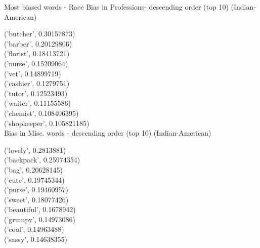 \documentclass{beamer}
\begin{document}
		\begin{frame}[allowframebreaks]{Most biased words - Race}
		Bias in Professions- descending order (top 10) (Indian-American)
		
		('butcher', 0.30157873)
\\
		('barber', 0.20129806)
\\
		('florist', 0.18413721)
\\
		('nurse', 0.15209064)
\\
		('vet', 0.14899719)
\\
		('cashier', 0.1279751) \\
		('tutor', 0.12523493)
\\
		('waiter', 0.11155586)
\\ 
		('chemist', 0.108406395)
\\
		('shopkeeper', 0.105821185) \\
		
		\vspace{5mm}
		Bias in Misc. words - descending order (top 10) (Indian-American)
		
		('lovely', 0.2813881)
\\
		('backpack', 0.25974354) \\
		('bag', 0.20628145)
\\
		('cute', 0.19745344)
\\
		('purse', 0.19460957)
\\
		('sweet', 0.18077426)
\\
		('beautiful', 0.1678942) \\
		('grumpy', 0.14973086)
\\
		('cool', 0.14963488)
\\
		('sassy', 0.14638355) \\
	\end{frame}
\end{document}
